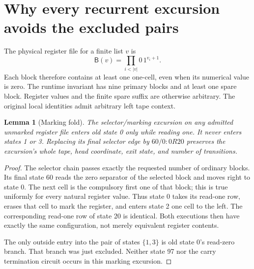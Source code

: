 \documentclass[11pt]{article}
\newtheorem{lemma}{Lemma}
\newcommand{\B}{\mathsf B}
\begin{document}
\section{Why every recurrent excursion avoids the excluded pairs}

The physical register file for a finite list $v$ is
\[
 \B(v)=\prod_{i<|v|} 0\,1^{v_i+1}.
\]
Each block therefore contains at least one one-cell, even when its
numerical value is zero. The runtime invariant has nine primary blocks
and at least one spare block. Register values and the finite spare suffix
are otherwise arbitrary. The original local identities admit arbitrary
left tape context.

\begin{lemma}[Marking fold]\label{lem:mark}
The selector/marking excursion on any admitted unmarked register file
enters old state 0 only while reading one. It never enters states 1 or 3.
Replacing its final selector edge by $60/0:0R20$ preserves the excursion's
whole tape, head coordinate, exit state, and number of transitions.
\end{lemma}
\begin{proof}
The selector chain passes exactly the requested number of ordinary blocks.
Its final state 60 reads the zero separator of the selected block and
moves right to state 0. The next cell is the compulsory first one of
that block; this is true uniformly for every natural register value.
Thus state 0 takes its read-one row, erases that cell to mark the register,
and enters state 2 one cell to the left. The corresponding read-one row
of state 20 is identical. Both executions then have exactly the same
configuration, not merely equivalent register contents.

The only outside entry into the pair of states $\{1,3\}$ is old state
0's read-zero branch. That branch was just excluded. Neither state 97
nor the carry termination circuit occurs in this marking excursion.
\end{proof}
\end{document}
